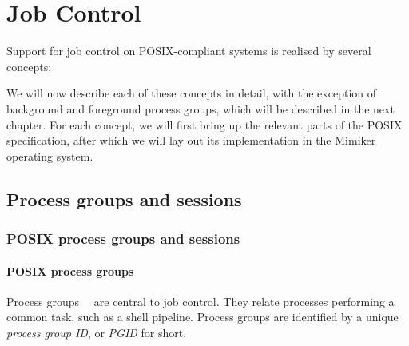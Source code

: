 \documentclass[shortabstract, manyadvisors, english, mgr]{iithesis}
\begin{document}
\chapter{Job Control}\label{chap:job-control}

Support for job control on POSIX-compliant systems is realised by several
concepts:

We will now describe each of these concepts in detail, with the exception of
background and foreground process groups, which will be described in the next chapter.
For each concept, we will first bring up the relevant parts of the POSIX
specification, after which we will lay out its implementation in the Mimiker
operating system.

\section{Process groups and sessions}

\subsection{POSIX process groups and sessions}
\label{chap:posix-groups-sessions}

\subsubsection{POSIX process groups}

Process groups~\cite[Section~3.296]{posix-defs}~\cite[Section~9.4]{apue} are
central to job control. They relate processes performing a common task, such as
a shell pipeline. Process groups are identified by a unique \textit{process
  group ID}, or \textit{PGID} for short.
\end{document}
